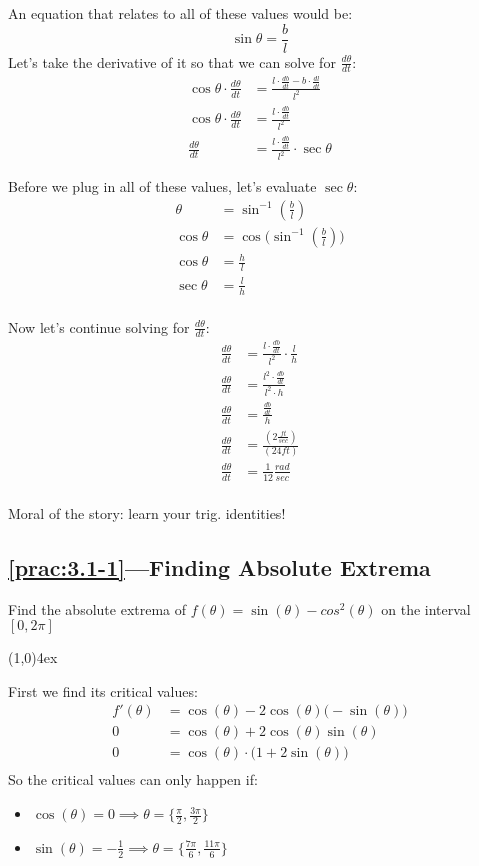 \documentclass{MathNotes}
\newcommand{\br}{
\begin{center}
\line(1,0){4ex}
\end{center}}
\newcommand{\continued}{
\mbox{}
\vfill
\textbf{Continued on Next Page...}\newpage
}
\begin{document}
An equation that relates to all of these values would be:
$$\sin\theta=\frac{b}{l}$$
Let's take the derivative of it so that we can solve for $\frac{d\theta}{dt}$:
\begin{align*}
    \cos\theta\cdot\frac{d\theta}{dt}&=\frac{l\cdot\frac{db}{dt}-b\cdot\frac{dl}{dt}}{l^2}\\
    \cos\theta\cdot\frac{d\theta}{dt}&=\frac{l\cdot\frac{db}{dt}}{l^2}\\
    \frac{d\theta}{dt}&=\frac{l\cdot\frac{db}{dt}}{l^2}\cdot\sec\theta
\end{align*}

Before we plug in all of these values, let's evaluate $\sec\theta$:
\begin{align*}
    \theta&=\sin^{-1}(\frac{b}{l})\\
    \cos\theta&=\cos\big(\sin^{-1}(\frac{b}{l})\big)\\
    \cos\theta&=\frac{h}{l}\\
    \sec\theta&=\frac{l}{h}\\
\end{align*}

Now let's continue solving for $\frac{d\theta}{dt}$:
\begin{align*}
    \frac{d\theta}{dt}&=\frac{l\cdot\frac{db}{dt}}{l^2}\cdot\frac{l}{h}\\
    \frac{d\theta}{dt}&=\frac{l^2\cdot\frac{db}{dt}}{l^2\cdot h}\\
    \frac{d\theta}{dt}&=\frac{\frac{db}{dt}}{h}\\
    \frac{d\theta}{dt}&=\frac{(2\frac{ft}{sec})}{(24ft)}\\
    \frac{d\theta}{dt}&=\frac{1}{12}\frac{rad}{sec}\\
\end{align*}

Moral of the story: learn your trig. identities!
\newpage
\subsection*{\ref{prac:3.1-1}---Finding Absolute Extrema}\label{ans:3.1-1}
Find the absolute extrema of $f(\theta)=\sin(\theta)-cos^2(\theta)$ on
the interval $[0, 2\pi]$
\br
First we find its critical values:
\begin{align*}
    f'(\theta)&=\cos(\theta)-2\cos(\theta)\big(-\sin(\theta)\big)\\
    0&=\cos(\theta)+2\cos(\theta)\sin(\theta)\\
    0&=\cos(\theta)\cdot\big(1+2\sin(\theta)\big)\\
\end{align*}
So the critical values can only happen if:
\begin{multicols}{2}
    \begin{itemize}
        \item $\cos(\theta)=0\implies\theta=\{\frac{\pi}{2}, \frac{3\pi}{2}\}$
        \item $\sin(\theta)=-\frac{1}{2}\implies\theta=\{\frac{7\pi}{6},
            \frac{11\pi}{6}\}$
    \end{itemize}
\end{multicols}
\end{document}
